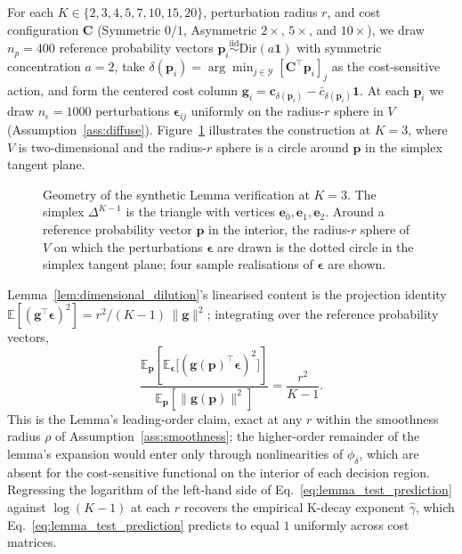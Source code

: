 For each $K \in \{2, 3, 4, 5, 7, 10, 15, 20\}$, perturbation radius $r$, and cost configuration $\mathbf{C}$ (Symmetric $0/1$, Asymmetric $2\times$, $5\times$, and $10\times$), we draw $n_p = 400$ reference probability vectors $\mathbf{p}_i \overset{\mathrm{iid}}{\sim} \mathrm{Dir}(a\mathbf{1})$ with symmetric concentration $a = 2$, take $\delta(\mathbf{p}_i) = \arg\min_{j \in \mathcal{Y}} [\mathbf{C}^\top \mathbf{p}_i]_j$ as the cost-sensitive action, and form the centered cost column $\mathbf{g}_i = \mathbf{c}_{\delta(\mathbf{p}_i)} - \bar c_{\delta(\mathbf{p}_i)}\mathbf{1}$. At each $\mathbf{p}_i$ we draw $n_{\epsilon} = 1000$ perturbations $\boldsymbol{\epsilon}_{ij}$ uniformly on the radius-$r$ sphere in $V$ (Assumption~\ref{ass:diffuse}). Figure~\ref{fig:lemma-test-setup} illustrates the construction at $K = 3$, where $V$ is two-dimensional and the radius-$r$ sphere is a circle around $\mathbf{p}$ in the simplex tangent plane.

\begin{figure}[H]
    \centering
    
    \caption{Geometry of the synthetic Lemma verification at $K = 3$. The simplex $\Delta^{K-1}$ is the triangle with vertices $\mathbf{e}_0, \mathbf{e}_1, \mathbf{e}_2$. Around a reference probability vector $\mathbf{p}$ in the interior, the radius-$r$ sphere of $V$ on which the perturbations $\boldsymbol{\epsilon}$ are drawn is the dotted circle in the simplex tangent plane; four sample realisations of $\boldsymbol{\epsilon}$ are shown.}%
    \label{fig:lemma-test-setup}
\end{figure}

Lemma~\ref{lem:dimensional_dilution}'s linearised content is the projection identity $\mathbb{E}[(\mathbf{g}^\top \boldsymbol{\epsilon})^2] = r^2/(K-1)\,\|\mathbf{g}\|^2$; integrating over the reference probability vectors,
\begin{equation}\label{eq:lemma_test_prediction}
    \frac{\mathbb{E}_\mathbf{p}\!\left[\mathbb{E}_{\boldsymbol{\epsilon}}\!\bigl[(\mathbf{g}(\mathbf{p})^\top \boldsymbol{\epsilon})^2\bigr]\right]}{\mathbb{E}_\mathbf{p}[\|\mathbf{g}(\mathbf{p})\|^2]} = \frac{r^2}{K-1}.
\end{equation}
This is the Lemma's leading-order claim, exact at any $r$ within the smoothness radius $\rho$ of Assumption~\ref{ass:smoothness}; the higher-order remainder of the lemma's expansion would enter only through nonlinearities of $\phi_\delta$, which are absent for the cost-sensitive functional on the interior of each decision region. Regressing the logarithm of the left-hand side of Eq.~\eqref{eq:lemma_test_prediction} against $\log(K-1)$ at each $r$ recovers the empirical K-decay exponent $\widehat{\gamma}$, which Eq.~\eqref{eq:lemma_test_prediction} predicts to equal $1$ uniformly across cost matrices.


